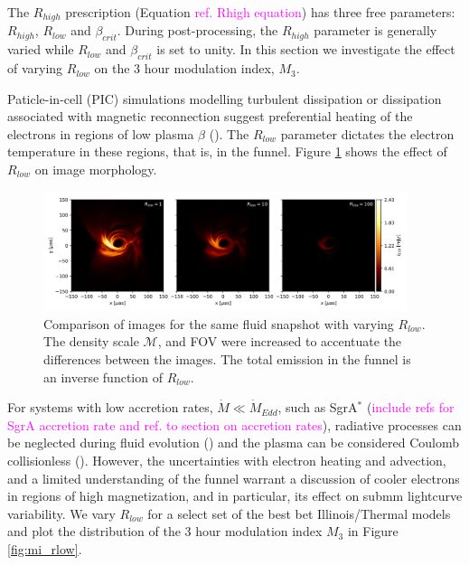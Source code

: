 The $R_{high}$ prescription (Equation \textcolor{magenta}{ref. Rhigh equation}) has three free parameters: $R_{high}$, $R_{low}$ and $\beta_{crit}$. During post-processing, the $R_{high}$ parameter is generally varied while $R_{low}$ and $\beta_{crit}$ is set to unity. In this section we investigate the effect of varying $R_{low}$ on the 3 hour modulation index, $M_{3}$.

Paticle-in-cell (PIC) simulations modelling turbulent dissipation or dissipation associated with magnetic reconnection suggest preferential heating of the electrons in regions of low plasma $\beta$ (\citealt{2010MNRAS.409L.104H, Rowan_2017, 10.1093/mnras/stx2530, Rowan_2019, Kawazura771, PhysRevX.10.041050, kawazura2021energy}). The $R_{low}$ parameter dictates the electron temperature in these regions, that is, in the funnel. Figure \ref{fig:rlow_comparison} shows the effect of $R_{low}$ on image morphology.

\begin{figure}
\centering
\includegraphics[width=0.95\textwidth]{figures/rlow_comparison_rhigh160.png}
\caption{Comparison of images for the same fluid snapshot with varying $R_{low}$. The density scale $\mathcal{M}$, and FOV were increased to accentuate the differences between the images. The total emission in the funnel is an inverse function of $R_{low}$.}
\label{fig:rlow_comparison}
\end{figure}

For systems with low accretion rates, $\Dot{M}\ll\Dot{M}_{Edd}$, such as SgrA$^{*}$ (\textcolor{magenta}{include refs for SgrA accretion rate and ref. to section on accretion rates}), radiative processes can be neglected during fluid evolution (\citealt{2012MNRAS.426.1928D, 10.1093/mnras/stw3116, Ryan_2017}) and the plasma can be considered Coulomb collisionless (\citealt{Mahadevan_1997, 10.1093/mnras/stw3116, Ryan_2017}). However, the uncertainties with electron heating and advection, and a limited understanding of the funnel warrant a discussion of cooler electrons in regions of high magnetization, and in particular, its effect on submm lightcurve variability. We vary $R_{low}$ for a select set of the best bet Illinois/Thermal models and plot the distribution of the 3 hour modulation index $M_{3}$ in Figure \ref{fig:mi_rlow}.

